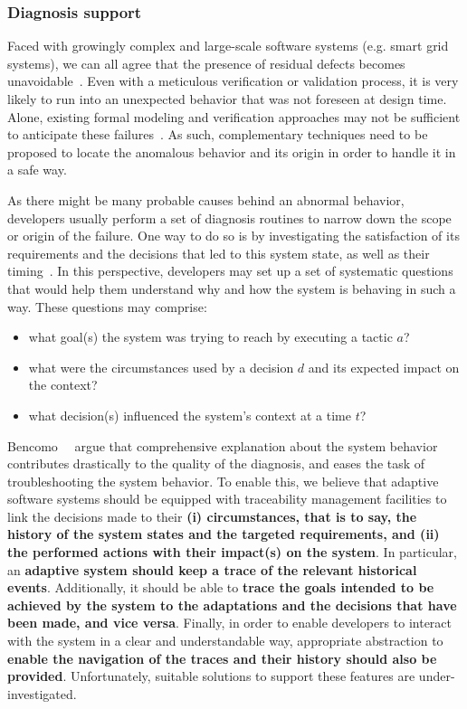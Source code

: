 \subsubsection{Diagnosis support}

Faced with growingly complex and large-scale software systems (e.g. smart grid systems), we can all agree that the presence of residual defects becomes unavoidable~\cite{DBLP:conf/icse/BarbosaLMJ17, DBLP:conf/icse/MongielloPS15, DBLP:conf/icse/HassanBB15}. 
Even with a meticulous verification or validation process, it is very likely to run into an unexpected behavior that was not foreseen at design time. Alone, existing formal modeling and verification approaches may not be sufficient to anticipate these failures~\cite{DBLP:conf/icse/TaharaOH17}. 
As such, complementary techniques need to be proposed to locate the anomalous behavior and its origin in order to handle it in a safe way.

As there might be many probable causes behind an abnormal behavior, developers usually perform a set of diagnosis routines to narrow down the scope or origin of the failure. One way to do so is by investigating the satisfaction of its requirements and the decisions that led to this system state, as well as their timing~\cite{DBLP:conf/iceccs/BencomoWSW12}.  
In this perspective, developers may set up a set of systematic questions that would help them understand why and how the system is behaving in such a way.
These questions may comprise: 
\begin{itemize}
   \item what goal(s) the system was trying to reach by executing a tactic $a$? 
   \item what were the circumstances used by a decision $d$ and its expected impact on the context?
   \item what decision(s) influenced the system's context at a time $t$? 
\end{itemize}

Bencomo~\etal~\cite{DBLP:conf/iceccs/BencomoWSW12} argue that comprehensive explanation about the system behavior contributes drastically to the quality of the diagnosis, and eases the task of troubleshooting the system behavior.
To enable this, we believe that adaptive software systems should be equipped with traceability management facilities to link the decisions made to their \textbf{(i) circumstances, that is to say, the history of the system states and the targeted requirements, and (ii) the performed actions with their impact(s) on the system}.
In particular, an \textbf{adaptive system should keep a trace of the relevant historical events}.
Additionally, it should be able to \textbf{trace the goals intended to be achieved by the system to the adaptations and the decisions that have been made, and vice versa}. 
Finally, in order to enable developers to interact with the system in a clear and understandable way, appropriate abstraction to \textbf{enable the navigation of the traces and their history should also be provided}.
Unfortunately, suitable solutions to support these features are under-investigated. 

